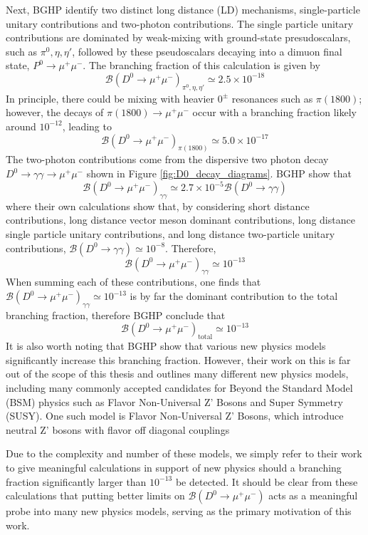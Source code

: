 Next, BGHP identify two distinct long distance (LD) mechanisms, single-particle unitary contributions and two-photon contributions. The single particle unitary contributions are dominated by weak-mixing with ground-state presudoscalars, such as $\pi^0, \eta, \eta'$, followed by these pseudoscalars decaying into a dimuon final state, $P^0 \to \mu^+ \mu^-$. The branching fraction of this calculation is given by
\begin{equation}
\mathcal{B}(D^0 \to \mu^+ \mu^-)_{\pi^0, \eta, \eta'} \simeq 2.5 \times 10^{-18}
\end{equation}
In principle, there could be mixing with heavier $0^\pm$ resonances such as $\pi(1800)$; however, the decays of $\pi(1800) \to \mu^+\mu^-$ occur with a branching fraction likely around $10^{-12}$, leading to
\begin{equation}
\mathcal{B}(D^0 \to \mu^+ \mu^-)_{\pi(1800)} \simeq  5.0 \times 10^{-17}
\end{equation}
The two-photon contributions come from the dispersive two photon decay $D^0 \to \gamma \gamma \to \mu^+ \mu^-$ shown in Figure \ref{fig:D0_decay_diagrams}. BGHP show that 
\begin{equation}
\mathcal{B}(D^0 \to \mu^+ \mu^-)_{\gamma\gamma} \simeq 2.7 \times 10^{-5} \mathcal{B}(D^0 \to \gamma\gamma)
\end{equation}
where their own calculations show that, by considering short distance contributions, long distance vector meson dominant contributions, long distance single particle unitary contributions, and long distance two-particle unitary contributions, $\mathcal{B}(D^0 \to \gamma\gamma) \simeq 10^{-8}$. Therefore, 
\begin{equation}
\mathcal{B}(D^0 \to \mu^+ \mu^-)_{\gamma\gamma} \simeq 10^{-13}
\end{equation}
When summing each of these contributions, one finds that $\mathcal{B}(D^0 \to \mu^+ \mu^-)_{\gamma\gamma} \simeq 10^{-13}$ is by far the dominant contribution to the total branching fraction, therefore BGHP conclude that
\begin{equation}
\mathcal{B}(D^0 \to \mu^+ \mu^-)_{\text{total}} \simeq 10^{-13}
\end{equation}
It is also worth noting that BGHP show that various new physics models significantly increase this branching fraction. However, their work on this is far out of the scope of this thesis and outlines many different new physics models, including many commonly accepted candidates for Beyond the Standard Model (BSM) physics such as Flavor Non-Universal Z' Bosons and Super Symmetry (SUSY). One such model is Flavor Non-Universal Z' Bosons, which introduce neutral Z' bosons with flavor off diagonal couplings 

Due to the complexity and number of these models, we simply refer to their work to give meaningful calculations in support of new physics should a branching fraction significantly larger than $10^{-13}$ be detected. It should be clear from these calculations that putting better limits on $\mathcal{B}(D^0 \to \mu^+ \mu^-)$ acts as a meaningful probe into many new physics models, serving as the primary motivation of this work. 
